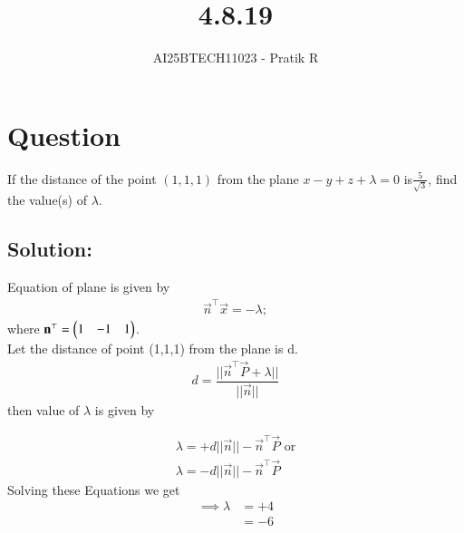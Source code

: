 \documentclass[journal]{IEEEtran}
\begin{document}

\vspace{3cm}

\title{4.8.19}
\author{AI25BTECH11023 - Pratik R}
{\let\newpage\relax\maketitle}

\renewcommand{\thefigure}{\theenumi}
\renewcommand{\thetable}{\theenumi}
\setlength{\intextsep}{10pt} %


\renewcommand{\thetable}{\theenumi}


\section*{\textbf{Question}}
If the distance of the point $(1,1,1)$ from the plane $x-y+z+ \lambda = 0$ is$\frac{5}{\sqrt{3}}$, find the value(s) of $\lambda$.

\subsection*{\textbf{Solution:}} 
Equation of plane is given by
\begin{align}
	\vec{n}^\top \vec{x} = -\lambda;
\end{align}
where $\mathbf{n}^\top = \begin{pmatrix}1&-1&1\end{pmatrix}$. \\

Let the distance of point (1,1,1) from the plane is d.
\begin{align}
	d = \dfrac{||\vec{n}^\top \vec{P} + \lambda||}{||\vec{n}||}
\end{align}
then value of $\lambda $ is given by

\begin{align}
	\lambda = + d||\vec{n}||-\vec{n}^\top \vec{P} \text{ or} \\
	\lambda = - d||\vec{n}||-\vec{n}^\top \vec{P}
\end{align}
Solving these Equations we get
\begin{align}
   \implies \lambda &= +4 \\
    &=-6
\end{align}
\newpage
\end{document}
